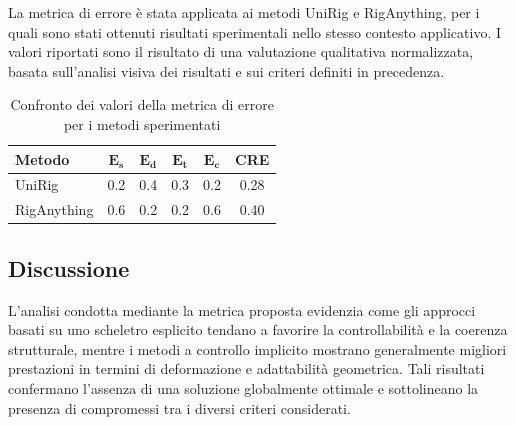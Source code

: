 La metrica di errore è stata applicata ai metodi UniRig e RigAnything, per i quali sono stati ottenuti risultati sperimentali nello stesso contesto applicativo. I valori riportati sono il risultato di una valutazione qualitativa normalizzata, basata sull’analisi visiva dei risultati e sui criteri definiti in precedenza.

\begin{table}[h]
\centering
\caption{Confronto dei valori della metrica di errore per i metodi sperimentati}
\label{tab:cre_methods}
\begin{tabular*}{\textwidth}{@{\extracolsep{\fill}}lccccc}
\hline
\textbf{Metodo} & $\mathbf{E_s}$ & $\mathbf{E_d}$ & $\mathbf{E_t}$ & $\mathbf{E_c}$ & \textbf{CRE} \\
\hline
UniRig      & 0.2 & 0.4 & 0.3 & 0.2 & 0.28 \\
RigAnything & 0.6 & 0.2 & 0.2 & 0.6 & 0.40 \\
\hline
\end{tabular*}
\end{table}

\subsection{Discussione}

L’analisi condotta mediante la metrica proposta evidenzia come gli approcci basati su uno scheletro esplicito tendano a favorire la controllabilità e la coerenza strutturale, mentre i metodi a controllo implicito mostrano generalmente migliori prestazioni in termini di deformazione e adattabilità geometrica. Tali risultati confermano l’assenza di una soluzione globalmente ottimale e sottolineano la presenza di compromessi tra i diversi criteri considerati.
